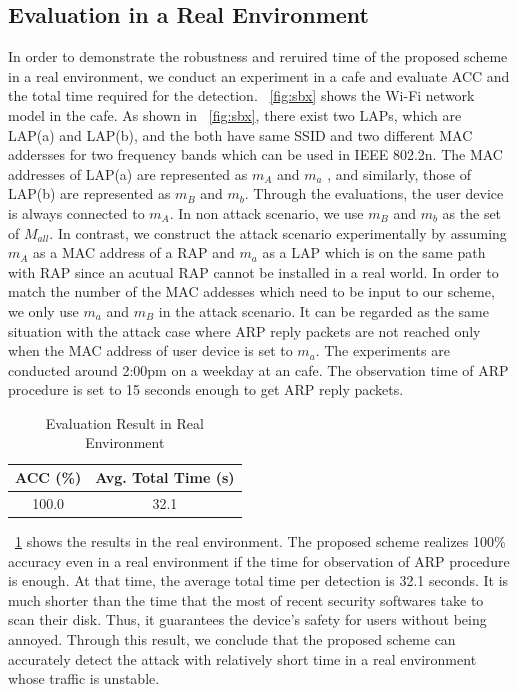\documentclass[conference]{IEEEtran}
\newcommand{\stba}{m_{a}}
\newcommand{\stbA}{m_{A}}
\newcommand{\stbb}{m_{b}}
\newcommand{\stbB}{m_{B}}
\begin{document}
\subsection{Evaluation in a Real Environment}
In order to demonstrate the robustness and reruired time of the proposed scheme in a real environment, we conduct an experiment in a cafe and evaluate ACC and the total time required for the detection.
\figurename~\ref{fig:sbx} shows the Wi-Fi network model in the cafe.
As shown in \figurename~\ref{fig:sbx}, there exist two LAPs, which are LAP(a) and LAP(b), and the both have same SSID and two different MAC addersses for two frequency bands which can be used in IEEE 802.2n.
The MAC addresses of LAP(a) are represented as $\stbA$ and $\stba$ , and similarly, those of LAP(b) are represented as $\stbB$ and $\stbb$.
Through the evaluations, the user device is always connected to $\stbA$.
In non attack scenario, we use $\stbB$ and $\stbb$ as the set of $M_{all}$.
In contrast, we construct the attack scenario experimentally by assuming $\stbA$ as a MAC address of a RAP and $\stba$ as a LAP which is on the same path with RAP since an acutual RAP cannot be installed in a real world.
In order to match the number of the MAC addesses which need to be input to our scheme, we only use $\stba$ and $\stbB$ in the attack scenario.
It can be regarded as the same situation with the attack case where ARP reply packets are not reached only when the MAC address of user device is set to $\stba$.
The experiments are conducted around 2:00pm on a weekday at an cafe.
The observation time of ARP procedure is set to 15 seconds enough to get ARP reply packets.
\begin{table}[h] 
    \begin{center}
        \caption{Evaluation Result in Real Environment}
        \label{tab:real}
        \begin{tabular}{c c} \hline
            ACC (\%) & Avg. Total Time (s) \\ \hline \hline
            100.0 & 32.1 \\ \hline
        \end{tabular}
    \end{center}
\end{table}

\tablename~\ref{tab:real} shows the results in the real environment.
The proposed scheme realizes 100\% accuracy even in a real environment if the time for observation of ARP procedure is enough.
At that time, the average total time per detection is 32.1 seconds.
It is much shorter than the time that the most of recent security softwares take to scan their disk.
Thus, it guarantees the device's safety for users without being annoyed.
Through this result, we conclude that the proposed scheme can accurately detect the attack with relatively short time in a real environment whose traffic is unstable.
\end{document}
